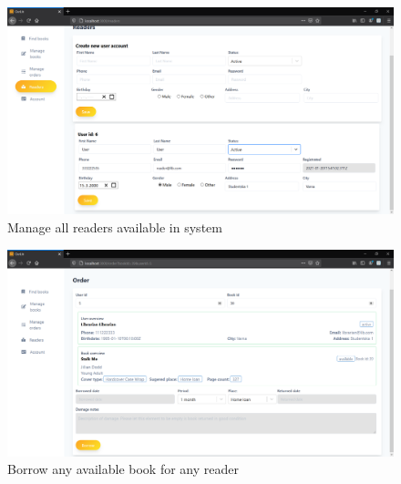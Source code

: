 \begin{figure}[H]
    \centering
    \includegraphics[width=\textwidth]{Include/Resources/FrontendScreens/React/librarianReaders.png}
    \caption{Manage all readers available in system}
    \label{fig:ScreenshotGUIlibrarianReaders}
\end{figure}




\begin{figure}[H]
    \centering
    \includegraphics[width=\textwidth]{Include/Resources/FrontendScreens/React/librarianBorrow.png}
    \caption{Borrow any available book for any reader}
    \label{fig:ScreenshotGUIlibrarianBorrow}
\end{figure}




